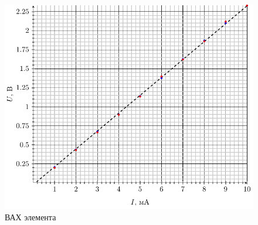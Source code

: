 
\pagestyle{empty} 
\fancyhead{} 
\fancyhead[R]{} 
\fancyhead[L]{} 

\fancyfoot{} 
\fancyfoot[C]{\thepage} 




\begin{figure}[H]
	\centering
	\includegraphics[width=\textwidth]{img/vax}
	\caption{ВАХ элемента}
	\label{fig:figr}
\end{figure}


